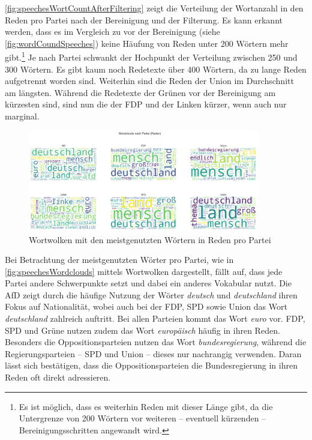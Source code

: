 \autoref{fig:speechesWortCountAfterFiltering} zeigt die Verteilung der Wortanzahl in den Reden pro Partei nach der Bereinigung und der Filterung. Es kann erkannt werden, dass es im Vergleich zu vor der Bereinigung (siehe \autoref{fig:wordCoundSpeeches}) keine Häufung von Reden unter \num{200} Wörtern mehr gibt.\footnote{Es ist möglich, dass es weiterhin Reden mit dieser Länge gibt, da die Untergrenze von \num{200} Wörtern vor weiteren -- eventuell kürzenden -- Bereinigungsschritten angewandt wird.} Je nach Partei schwankt der Hochpunkt der Verteilung zwischen \num{250} und \num{300} Wörtern. Es gibt kaum noch Redetexte über \num{400} Wörtern, da zu lange Reden aufgetrennt worden sind. Weiterhin sind die Reden der Union im Durchschnitt am längsten. Während die Redetexte der Grünen vor der Bereinigung am kürzesten sind, sind nun die der \ac{FDP} und der Linken kürzer, wenn auch nur marginal.

\begin{figure}[H]
    \centering
    \includegraphics[width=0.9\textwidth]{data/images/speeches/speeches_wordclouds.png}
    \caption{Wortwolken mit den meistgenutzten Wörtern in Reden pro Partei} \label{fig:speechesWordclouds}
\end{figure}

Bei Betrachtung der meistgenutzten Wörter pro Partei, wie in \autoref{fig:speechesWordclouds} mittels Wortwolken dargestellt, fällt auf, dass jede Partei andere Schwerpunkte setzt und dabei ein anderes Vokabular nutzt. Die \ac{AfD} zeigt durch die häufige Nutzung der Wörter \textit{deutsch} und \textit{deutschland} ihren Fokus auf Nationalität, wobei auch bei der \ac{FDP}, \ac{SPD} sowie Union das Wort \textit{deutschland} zahlreich auftritt. Bei allen Parteien kommt das Wort \textit{euro} vor. \ac{FDP}, \ac{SPD} und Grüne nutzen zudem das Wort \textit{europäisch} häufig in ihren Reden. Besonders die Oppositionsparteien nutzen das Wort \textit{bundesregierung}, während die Regierungsparteien -- \ac{SPD} und Union -- dieses nur nachrangig verwenden. Daran lässt sich bestätigen, dass die Oppositionsparteien die Bundesregierung in ihren Reden oft direkt adressieren.

